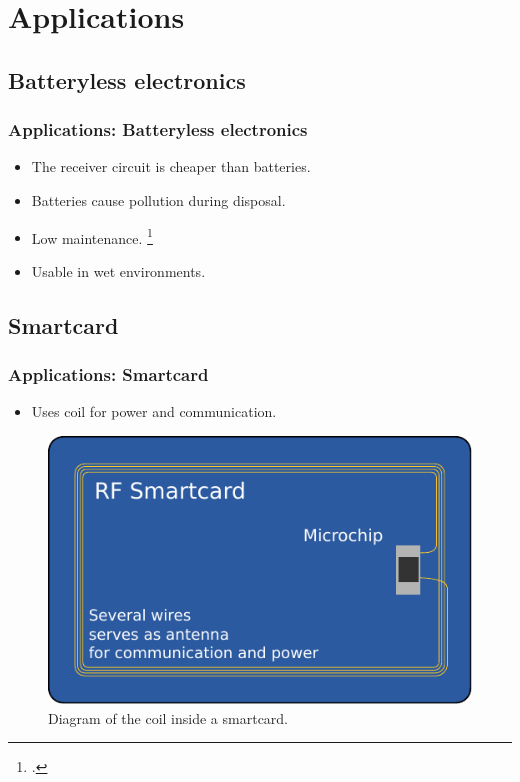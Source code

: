 \documentclass{beamer}
\begin{document}
\section{Applications}

\subsection{Batteryless electronics}
\begin{frame}
  \frametitle{Applications: Batteryless electronics}
  \begin{itemize}
    \item The receiver circuit is cheaper than batteries.
    \item Batteries cause pollution during disposal.
    \item Low maintenance. \footcite{Batteries}
    \item Usable in wet environments.
  \end{itemize}
\end{frame}

\subsection{Smartcard}
\begin{frame}
  \frametitle{Applications: Smartcard}
  \begin{itemize}
    \item Uses coil for power and communication.
  \end{itemize}
    \begin{figure}
      \includegraphics[scale=0.75]{images/smartcard.pdf}
      \caption{Diagram of the coil inside a smartcard. \textcite{wikiRIC}}
    \end{figure}
\end{frame}
\end{document}
